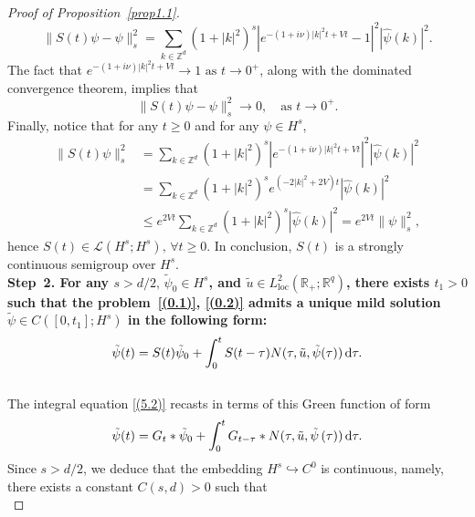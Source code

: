\documentclass[review]{elsarticle}
\theoremstyle{dotless}
\def\d{{\,\rm d}}
\def \leq{\leqslant}
\def \geq{\geqslant}
\numberwithin{equation}{section}
\begin{document}
\begin{proof}[Proof of Proposition~\ref{prop1.1}]
	\begin{equation*}
		\|S(t) \psi-\psi\|_{s}^2= \sum_{k \in \mathbb{Z}^d}\left(1+|k|^2\right)^s |   e^{-(1+i \nu)|k|^2 t+V t}-1 |^2 |\widehat{\psi}(k) |^2 .
	\end{equation*}The fact that $ e^{-(1+i \nu)|k|^2 t+V t}\rightarrow 1 \text{ as } t\rightarrow 0^+  $, along with the dominated convergence theorem, implies that 
	\begin{equation*}
		\|S(t) \psi-\psi\|_{s}^2\rightarrow 0,\quad \text{as }t\rightarrow 0^+.
	\end{equation*}
	Finally, notice that for any $ t\geq 0 $ and for any $ \psi\in H^s $,
	\begin{equation*}
		\begin{aligned}
			\|S(t) \psi\|_{s}^2&=  \sum_{k \in \mathbb{Z}^d}\left(1+|k|^2\right)^s |e^{-(1+i \nu)|k|^2 t+V t} |^2 |\widehat{\psi}(k)|^2 \\
			&=  \sum_{k \in \mathbb{Z}^d}\left(1+|k|^2\right)^s e^{(-2|k|^2 +2V )t} |\widehat{\psi}(k)|^2 \\
			&\leq  e^{2Vt} \sum_{k \in \mathbb{Z}^d}\left(1+|k|^2\right)^s  |\widehat{\psi}(k) |^2 =    e^{2Vt} \|\psi\|_s^2,
		\end{aligned}
	\end{equation*} hence $ S(t)\in \mathcal{L}(H^s;H^s),\, \forall t\geq 0 $. In conclusion,   $S(t)$ is a strongly continuous semigroup over $H^s$.
	\\
	\textbf{Step~2. For any $s>d / 2,\, \tilde{\psi}_0 \in H^s$, and $\tilde{u} \in L_{\text{loc}}^2\left(\mathbb{R}_{+} ; \mathbb{R}^q\right)$, there exists $ t_1>0 $ such that the problem~\eqref{(0.1)}, \eqref{(0.2)} admits a unique mild solution $ \tilde{\psi}\in C\left([0,t_1];H^s\right) $ in the following form:
		\begin{equation}\label{(5.2)}
			\tilde{\psi}(t)= S(t)\tilde{\psi}_0 + \int_0^t S(t-\tau) N(\tau,\tilde{u},\tilde{\psi}(\tau))\d\tau.
	\end{equation}}
	\\
	The integral equation \eqref{(5.2)} recasts in terms of this Green function of form
	\begin{equation*}
		\tilde{\psi}(t)=G_t * \tilde{\psi}_0+\int_0^t G_{t-\tau} * N (\tau,\tilde{u},\tilde{\psi}\left(\tau\right) ) \d \tau.
	\end{equation*}
	Since $s>d / 2$, we deduce that the embedding $H^s \hookrightarrow C^0$ is continuous, namely, there exists a constant $C\left(s,d\right)>0$ such that
	\begin{equation*}

\end{equation*}
\end{proof}
\end{document}
